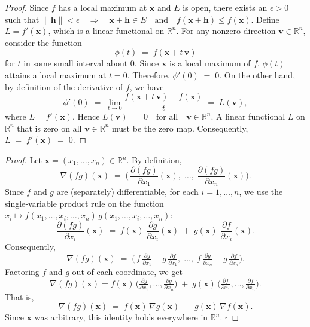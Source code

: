 \documentclass[11pt]{article}
\begin{document}
\begin{exercise}{9.8}
    \begin{proof}
        Since $f$ has a local maximum at $\mathbf{x}$ and $E$ is open, there exists 
an $\epsilon>0$ such that
\(
\|\mathbf{h}\| < \epsilon
\quad\Longrightarrow\quad
\mathbf{x} + \mathbf{h} \in E
\quad\text{and}\quad
f(\mathbf{x}+\mathbf{h}) \le f(\mathbf{x}).
\)
Define $L = f'(\mathbf{x})$, 
which is a linear functional on $\mathbb{R}^n$. For any nonzero direction $\mathbf{v} \in \mathbb{R}^n$, consider the function 
\[
\phi(t) \;=\; f(\mathbf{x} + t\,\mathbf{v})
\]
for $t$ in some small interval about $0$.  Since $\mathbf{x}$ is a local maximum of $f$, 
$\phi(t)$ attains a local maximum at $t=0$.  Therefore,
\(
\phi'(0) \;=\; 0.
\)
On the other hand, by definition of the derivative of $f$, we have
\[
\phi'(0)
\;=\;
\lim_{t\to0} \frac{f(\mathbf{x} + t\,\mathbf{v}) - f(\mathbf{x})}{t}
\;=\;
L(\mathbf{v}),
\]
where $L = f'(\mathbf{x})$.  Hence
\(
L(\mathbf{v}) \;=\; 0
\quad\text{for all}\quad \mathbf{v}\in \mathbb{R}^n.
\)
A linear functional $L$ on $\mathbb{R}^n$ that is zero on all $\mathbf{v}\in\mathbb{R}^n$ 
must be the zero map.  Consequently, 
\(
L \;=\; f'(\mathbf{x}) \;=\; 0.
\)
    \end{proof}
\end{exercise}

\begin{exercise}{9.11}
    \begin{proof}
        Let $\mathbf{x} = (x_1, \dots, x_n) \in \mathbb{R}^n$.  By definition,
\[
\nabla(fg)(\mathbf{x})
\;=\;
\biggl(\,
\frac{\partial (fg)}{\partial x_1}(\mathbf{x}), 
\;\dots,\;
\frac{\partial (fg)}{\partial x_n}(\mathbf{x})
\biggr).
\]
Since $f$ and $g$ are (separately) differentiable, for each $i = 1,\dots,n$, we use 
the single‐variable product rule on the function $x_i \mapsto f(x_1, \dots, x_i, \dots, x_n)\,g(x_1, \dots, x_i, \dots, x_n)$:
\[
\frac{\partial (fg)}{\partial x_i}(\mathbf{x}) 
\;=\;
f(\mathbf{x}) \;\frac{\partial g}{\partial x_i}(\mathbf{x})
\;+\;
g(\mathbf{x}) \;\frac{\partial f}{\partial x_i}(\mathbf{x}).
\]
Consequently,
\[
\nabla(fg)(\mathbf{x})
\;=\;
\bigl(\,
f \,\tfrac{\partial g}{\partial x_1} + g\,\tfrac{\partial f}{\partial x_1}, 
\;\dots,\;
f\,\tfrac{\partial g}{\partial x_n} + g\,\tfrac{\partial f}{\partial x_n}
\bigr).
\]
Factoring $f$ and $g$ out of each coordinate, we get
\[
\nabla(fg)(\mathbf{x})
= 
f(\mathbf{x})\,
\bigl(\tfrac{\partial g}{\partial x_1}, \dots, \tfrac{\partial g}{\partial x_n}\bigr)
\;+\;
g(\mathbf{x})\,
\bigl(\tfrac{\partial f}{\partial x_1}, \dots, \tfrac{\partial f}{\partial x_n}\bigr).
\]
That is,
\[
\nabla(fg)(\mathbf{x}) 
\;=\; 
f(\mathbf{x})\,\nabla g(\mathbf{x})
\;+\;
g(\mathbf{x})\,\nabla f(\mathbf{x}).
\]
Since $\mathbf{x}$ was arbitrary, this identity holds everywhere in $\mathbb{R}^n$. 
\quad$\square$
    \end{proof}
\end{exercise}
\end{document}
